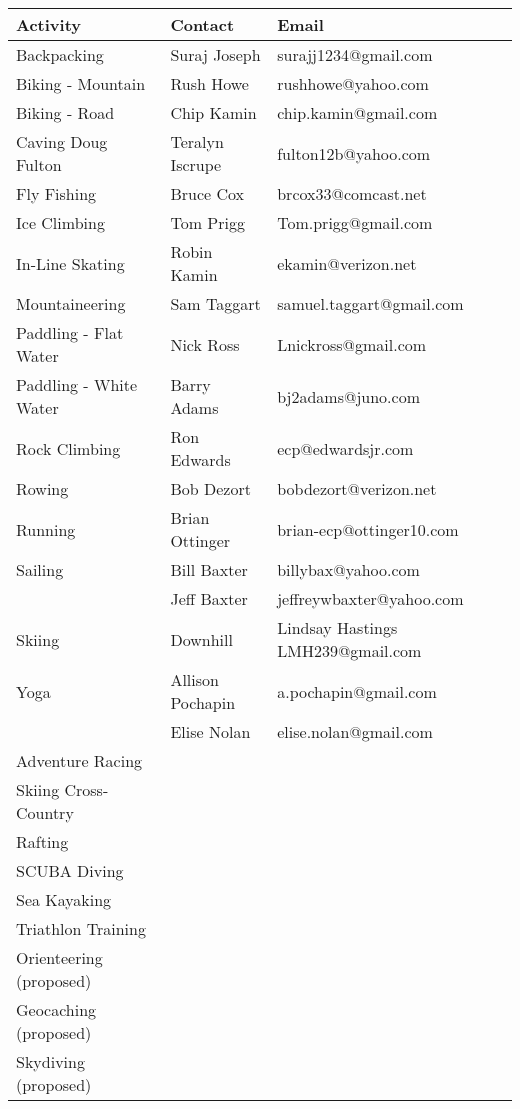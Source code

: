 \documentclass[10pt,a4paper]{article}
\begin{document}
\begin{center}
    \begin{tabular}{ | l | l | l | }
    \hline
    \textbf{Activity} & \textbf{Contact} & \textbf{Email} \\\hline
	Backpacking & Suraj Joseph & surajj1234@gmail.com \\ \hline
	Biking - Mountain & Rush Howe & rushhowe@yahoo.com \\ \hline
	Biking - Road & Chip Kamin & chip.kamin@gmail.com \\ \hline
    Caving Doug Fulton & Teralyn Iscrupe & fulton12b@yahoo.com\\ \hline
    Fly Fishing & Bruce Cox & brcox33@comcast.net\\ \hline
    Ice Climbing & Tom Prigg & Tom.prigg@gmail.com\\ \hline
    In-Line Skating & Robin Kamin & ekamin@verizon.net\\ \hline
    Mountaineering & Sam Taggart & samuel.taggart@gmail.com\\ \hline
    Paddling - Flat Water & Nick Ross & Lnickross@gmail.com\\ \hline
    Paddling - White Water & Barry Adams & bj2adams@juno.com\\ \hline
    Rock Climbing & Ron Edwards & ecp@edwardsjr.com\\ \hline
    Rowing & Bob Dezort & bobdezort@verizon.net\\ \hline
    Running & Brian Ottinger &  brian-ecp@ottinger10.com\\ \hline
    Sailing & Bill Baxter & billybax@yahoo.com\\ \hline
		   &  Jeff Baxter& jeffreywbaxter@yahoo.com\\ \hline
	Skiing & Downhill  &  Lindsay Hastings LMH239@gmail.com\\ \hline
	Yoga  &  Allison Pochapin & a.pochapin@gmail.com\\ \hline
            &  Elise Nolan & elise.nolan@gmail.com\\ \hline
	Adventure Racing & & \\ \hline
	Skiing  Cross-Country & & \\ \hline
	Rafting & & \\ \hline
	SCUBA Diving & & \\ \hline
	Sea Kayaking & & \\ \hline
	Triathlon Training & & \\ \hline
	Orienteering (proposed) & & \\ \hline
	Geocaching (proposed) & & \\ \hline
	Skydiving (proposed) & & \\ \hline
	 \hline
    \end{tabular}
\end{center}
\end{document}
